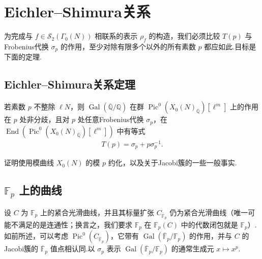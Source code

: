 
\section{Eichler--Shimura关系}\label{sec:modular-2-4}

为完成与 $f\in\mathcal S_2(\Gamma_0(N))$ 相联系的表示 $\rho_f$ 的构造，我们必须比较 $T(p)$ 与Frobenius代换 $\sigma_p$ 的作用，至少对除有限多个以外的所有素数 $p$ 都应如此.目标是下面的定理.



\subsection{Eichler--Shimura关系定理}\label{sec:modular-2-4-1}

\begin{theorem*}

若素数 $p$ 不整除 $\ell N$，则 $\operatorname{Gal}(\overline{\mathbb Q}/\mathbb Q)$ 在群 $\operatorname{Pic}^0(X_0(N)_{\overline{\mathbb Q}})[\ell^m]$ 上的作用在 $p$ 处非分歧，且对 $p$ 处任意Frobenius代换 $\sigma_p$，在 $\operatorname{End}(\operatorname{Pic}^0(X_0(N)_{\overline{\mathbb Q}})[\ell^m])$ 中有等式
\begin{align*}
T(p)=\sigma_p+p\sigma_p^{-1}.
\end{align*}
\end{theorem*}

证明使用模曲线 $X_0(N)$ 的模 $p$ 约化，以及关于Jacobi簇的一些一般事实.



\subsection{\texorpdfstring{$\mathbb F_p$}{Fₚ} 上的曲线}\label{sec:modular-2-4-2}

设 $C$ 为 $\mathbb F_p$ 上的紧合光滑曲线，并且其标量扩张 $C_{\overline{\mathbb F}_p}$ 仍为紧合光滑曲线（唯一可能不满足的是连通性；换言之，我们要求 $\mathbb F_p$ 在 $\mathbb F_p(C)$ 中的代数闭包就是 $\mathbb F_p$）.如前所述，可以考虑 $\operatorname{Pic}^0(C_{\overline{\mathbb F}_p})$，它带有 $\operatorname{Gal}(\overline{\mathbb F}_p/\mathbb F_p)$ 的作用，并与 $C$ 的Jacobi簇的 $\overline{\mathbb F}_p$ 值点相认同.以 $\sigma_p$ 表示 $\operatorname{Gal}(\overline{\mathbb F}_p/\mathbb F_p)$ 的通常生成元 $x\mapsto x^p$.



